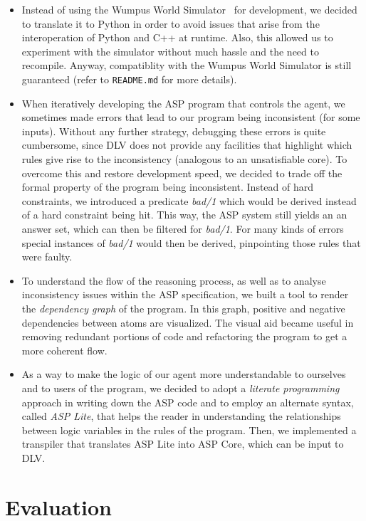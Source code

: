 \documentclass{llncs}
\begin{document}
\begin{itemize}
	\item Instead of using the Wumpus World Simulator~\cite{WWS} for development, we decided to translate it to Python in order to avoid issues that arise from the interoperation of Python and C++ at runtime. Also, this allowed us to experiment with the simulator without much hassle and the need to recompile. Anyway, compatiblity with the Wumpus World Simulator is still guaranteed (refer to \texttt{README.md} for more details).
	\item When iteratively developing the ASP program that controls the agent, we sometimes made errors that lead to our program being inconsistent (for some inputs).
	Without any further strategy, debugging these errors is quite cumbersome, since DLV does not provide any facilities that highlight which rules give rise to the inconsistency (analogous to an unsatisfiable core).
	To overcome this and restore development speed, we decided to trade off the formal property of the program being inconsistent.
	Instead of hard constraints, we introduced a predicate \emph{bad/1} which would be derived instead of a hard constraint being hit.
	This way, the ASP system still yields an an answer set, which can then be filtered for \emph{bad/1}.
	For many kinds of errors special instances of \emph{bad/1} would then be derived, pinpointing those rules that were faulty.
	\item To understand the flow of the reasoning process, as well as to analyse inconsistency issues within the ASP specification, we built a tool to render the \emph{dependency graph} of the program.
	In this graph, positive and negative dependencies between atoms are visualized.
	The visual aid became useful in removing redundant portions of code and refactoring the program to get a more coherent flow.
	\item As a way to make the logic of our agent more understandable to ourselves and to users of the program, we decided to adopt a \emph{literate programming} approach in writing down the ASP code and to employ an alternate syntax, called \emph{ASP Lite}, that helps the reader in understanding the relationships between logic variables in the rules of the program.
	Then, we implemented a transpiler that translates ASP Lite into ASP Core, which can be input to DLV.
\end{itemize}

\section{Evaluation}
\end{document}
